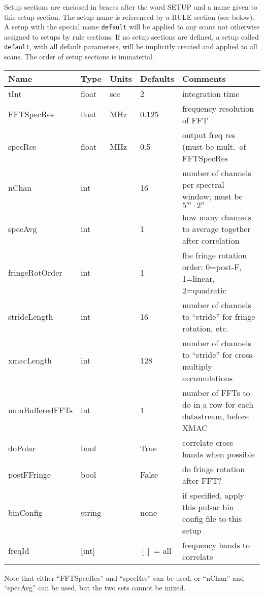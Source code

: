 Setup sections are enclosed in braces after the word SETUP and a name given to this setup section.
The setup name is referenced by a RULE section (see below).
A setup with the special name {\tt default} will be applied to any scans not otherwise assigned to setups by rule sections.
If no setup sections are defined, a setup called {\tt default}, with all default parameters, will be implicitly created and applied to all scans.
The order of setup sections is immaterial.

\begin{center}
\begin{tabular}{l l l l l}
\hline
Name		& Type		& Units	& Defaults	& Comments \\
\hline
tInt		& float		& sec	& 2		& integration time \\
FFTSpecRes	& float		& MHz	& 0.125		& frequency resolution of FFT \\
specRes		& float		& MHz	& 0.5		& output freq res (must be mult.\ of FFTSpecRes \\
nChan		& int		&	& 16		& number of channels per spectral window; must be $5^m \cdot 2^n$ \\
specAvg		& int		&	& 1		& how many channels to average together after correlation \\
fringeRotOrder	& int		&	& 1		& fhe fringe rotation order: 0=post-F, 1=linear, 2=quadratic \\
strideLength	& int		& 	& 16		& number of channels to ``stride'' for fringe rotation, etc. \\
xmacLength	& int		&	& 128		& number of channels to ``stride'' for cross-multiply accumulations \\
numBufferedFFTs & int		&	& 1		& number of FFTs to do in a row for each datastream, before XMAC \\
doPolar		& bool		&	& True		& correlate cross hands when possible \\
postFFringe	& bool		&	& False		& do fringe rotation after FFT? \\
binConfig	& string	&	& none		& if specified, apply this pulsar bin config file to this setup \\
freqId		& $[$int$]$	&	& $[ ]$ = all	& frequency bands to correlate \\
\hline
\hline
\end{tabular}
\end{center}

Note that either ``FFTSpecRes'' and ``specRes'' can be used, or ``nChan'' and ``specAvg'' can be used, but the two sets cannot be mixed.

